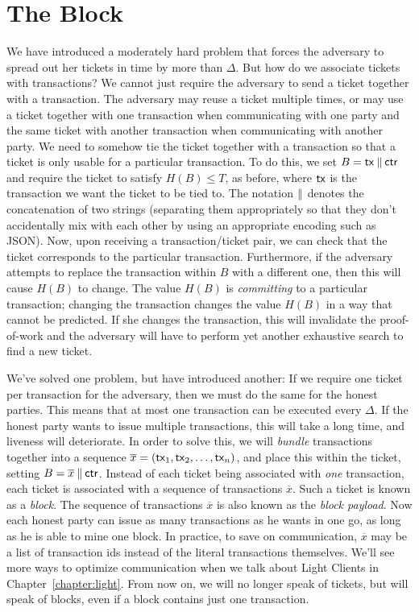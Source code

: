 \section{The Block}

We have introduced a moderately hard problem that forces the adversary to spread out her
tickets in time by more than $\Delta$. But how do we associate tickets with transactions?
We cannot just require the adversary to send a ticket together with a transaction.
The adversary may reuse a ticket multiple times, or may use a ticket together with one transaction
when communicating with one party and the same ticket with another transaction when
communicating with another party. We need to somehow tie the ticket together with a
transaction so that a ticket is only usable for a particular transaction.
To do this, we set $B = \mathsf{tx} \mathbin{\|} \mathsf{ctr}$ and require the ticket to satisfy $H(B) \leq T$,
as before, where $\mathsf{tx}$ is the transaction we want the ticket to be tied to.
The notation $\mathbin{\|}$ denotes the concatenation of two strings (separating them appropriately
so that they don't accidentally mix with each other by using an appropriate encoding such
as JSON).
Now, upon receiving a transaction/ticket pair, we can check that the ticket corresponds
to the particular transaction. Furthermore, if the adversary attempts to replace the
transaction within $B$ with a different one, then this will cause $H(B)$ to change.
The value $H(B)$ is \emph{committing} to a particular transaction; changing the transaction
changes the value $H(B)$ in a way that cannot be predicted. If she changes the transaction,
this will invalidate the proof-of-work and the adversary will have to perform yet another
exhaustive search to find a new ticket.

We've solved one problem, but have introduced another: If we require one ticket per transaction
for the adversary, then we must do the same for the honest parties. This means that at most one
transaction can be executed every $\Delta$. If the honest party wants to issue multiple transactions,
this will take a long time, and liveness will deteriorate. In order to solve this, we will \emph{bundle}
transactions together into a sequence $\overline{x} = (\mathsf{tx}_1, \mathsf{tx}_2, \ldots, \mathsf{tx}_n)$, and place
this within the ticket, setting $B = \overline{x} \mathbin{\|} \mathsf{ctr}$.
Instead of each ticket being associated with \emph{one} transaction, each ticket
is associated with a sequence of transactions $\overline{x}$.
Such a ticket is known as a \emph{block}.
The sequence of transactions $\overline{x}$ is also known as the \emph{block payload}.
Now each honest party can issue as many transactions
as he wants in one go, as long as he is able to mine one block.
In practice, to save on communication, $\overline{x}$ may be a list of transaction ids instead
of the literal transactions themselves. We'll see more ways to optimize communication
when we talk about Light Clients in Chapter~\ref{chapter:light}.
From now on, we will no longer speak of tickets, but will speak of blocks,
even if a block contains just one transaction.

